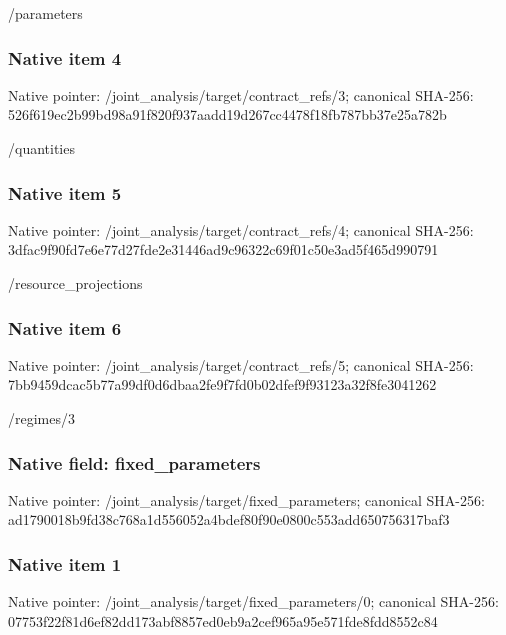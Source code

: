 \documentclass[10pt,a4paper]{article}
\begin{document}
\begingroup\raggedright\sloppy /\allowbreak{}parameters\par\endgroup

\subsubsection{Native item 4}
Native pointer: /joint\_\allowbreak{}analysis/target/contract\_\allowbreak{}refs/3; canonical SHA-256: 526f619ec2b99bd98a91f820f937aadd19d267cc4478f18fb787bb37e25a782b

\begingroup\raggedright\sloppy /\allowbreak{}quantities\par\endgroup

\subsubsection{Native item 5}
Native pointer: /joint\_\allowbreak{}analysis/target/contract\_\allowbreak{}refs/4; canonical SHA-256: 3dfac9f90fd7e6e77d27fde2e31446ad9c96322c69f01c50e3ad5f465d990791

\begingroup\raggedright\sloppy /\allowbreak{}resource\_\allowbreak{}projections\par\endgroup

\subsubsection{Native item 6}
Native pointer: /joint\_\allowbreak{}analysis/target/contract\_\allowbreak{}refs/5; canonical SHA-256: 7bb9459dcac5b77a99df0d6dbaa2fe9f7fd0b02dfef9f93123a32f8fe3041262

\begingroup\raggedright\sloppy /\allowbreak{}regimes/\allowbreak{}3\par\endgroup

\subsubsection{Native field: fixed\_\allowbreak{}parameters}
Native pointer: /joint\_\allowbreak{}analysis/target/fixed\_\allowbreak{}parameters; canonical SHA-256: ad1790018b9fd38c768a1d556052a4bdef80f90e0800c553add650756317baf3

\subsubsection{Native item 1}
Native pointer: /joint\_\allowbreak{}analysis/target/fixed\_\allowbreak{}parameters/0; canonical SHA-256: 07753f22f81d6ef82dd173abf8857ed0eb9a2cef965a95e571fde8fdd8552c84
\end{document}
